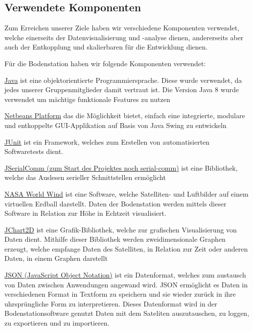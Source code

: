 \subsection{Verwendete Komponenten}
Zum Erreichen unserer Ziele haben wir verschiedene Komponenten verwendet, welche einerseits der Datenvisualisierung und -analyse dienen, andererseits aber auch der Entkopplung und skalierbaren für die Entwicklung dienen.

Für die Bodenstation haben wir folgende Komponenten verwendet:
\begin{description}
	\item \href {http://www.oracle.com/technetwork/java/javase/downloads/jdk8-downloads-2133151.html}{Java} ist eine objektorientierte Programmiersprache. Diese wurde verwendet, da jedes unserer Gruppenmitglieder damit vertraut ist. Die Version Java 8 wurde verwendet um mächtige funktionale Features zu nutzen
	\item \href {https://netbeans.org/features/platform/}{Netbeans Platform} das die Möglichkeit bietet, einfach eine integrierte, modulare und entkoppelte GUI-Applikation auf Basis von Java Swing zu entwickeln
	\item \href {http://junit.org/}{JUnit} ist ein Framework, welches zum Erstellen von automatisierten Softwaretests dient.
	\item \href {http://fazecast.github.io/jSerialComm/}{JSerialComm (zum Start des Projektes noch serial-comm)} ist eine Bibliothek, welche das Auslesen serieller Schnittstellen ermöglicht 
	\item \href {http://worldwind.arc.nasa.gov/java/}{NASA World Wind} ist eine Software, welche Satelliten- und Luftbilder auf einem virtuellen Erdball darstellt. Daten der Bodenstation werden mittels dieser Software in Relation zur Höhe in Echtzeit visualisiert.
	\item \href {http://jchart2d.sourceforge.net/}{JChart2D} ist eine Grafik-Bibliothek, welche zur grafischen Visualisierung von Daten dient. Mithilfe dieser Bibliothek werden zweidimensionale Graphen erzeugt, welche empfange Daten des Satelliten, in Relation zur Zeit oder anderen Daten, in einem Graphen darstellt
	\item \href{http://www.json.org/}{JSON (JavaScript Object Notation)} ist ein Datenformat, welches zum austausch von Daten zwischen Anwendungen angewand wird. JSON ermöglicht es Daten in verschiedenen Format in Textform zu speichern und sie wieder zurück in ihre uhrsprüngliche Form zu interpretieren. Dieses Datenformat wird in der Bodenstationsoftware genutzt Daten mit dem Sateliten auszutauschen, zu loggen, zu exportieren und zu importieren.
\end{description}